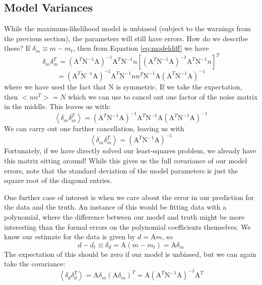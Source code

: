 \documentclass[letterpaper,11pt,preprint]{aastex}
\begin{document}
{\subsection{Model Variances}
While the maximum-likelihood model is unbiased (subject to the
warnings from the previous section), the parameters will still have
errors.  How do we describe these?  If $\delta_m \equiv m-m_t$, then
from Equation \ref{eq:modeldiff} we have
$$\delta_m \delta_m^T = \left (\mathrm{A}^T \mathrm{N}^{-1}\mathrm{A}
\right)^{-1}\mathrm{A}^T\mathrm{N}^{-1}n 
\left [  \left (\mathrm{A}^T \mathrm{N}^{-1}\mathrm{A}
  \right)^{-1}\mathrm{A}^T\mathrm{N}^{-1}n \right ]^T$$
$$=\left (\mathrm{A}^T \mathrm{N}^{-1}\mathrm{A}
\right)^{-1}\mathrm{A}^T\mathrm{N}^{-1}n n^T \mathrm{N}^{-1}
\mathrm{A} \left (\mathrm{A}^T \mathrm{N}^{-1}\mathrm{A}\right)^{-1}$$
where we have used the fact that $\mathrm{N}$ is symmetric.  If we
take the expectation, then $<nn^T>=N$ which we can use to cancel out
one factor of the noise matrix in the middle.  This leaves us with:
$$\left < \delta_m \delta_m^T \right > =\left (\mathrm{A}^T
\mathrm{N}^{-1}\mathrm{A}\right)^{-1}\mathrm{A}^T\mathrm{N}^{-1}
\mathrm{A} \left (\mathrm{A}^T \mathrm{N}^{-1}\mathrm{A}\right)^{-1} $$
We can carry out one further cancellation, leaving us with 
\begin{equation} \label{eq:modelerrs}
\left < \delta_m \delta_m^T \right > =\left
(\mathrm{A}^T\mathrm{N}^{-1}\mathrm{A}\right)^{-1}
\end{equation}
Fortunately, if we have directly solved our least-squares problem, we
already have this matrix sitting around!  While this gives us the full
covariance of our model errors, note that the standard deviation of
the model parameters is just the square root of the diagonal entries.  
 
One further case of interest is when we care about the error in our
prediction for the data and the truth.  An instance of this would be
fitting data with a polynomial, where the difference between our model
and truth might be more interesting than the formal errors on the polynomial
coefficients themselves.  We know our estimate for the data is given
by $d=\mathrm{A}m$, so 
$$d-d_t\equiv \delta_d=\mathrm{A}(m-m_t)=\mathrm{A}\delta_m$$
The expectation of this should be zero if our model is unbiased, but
we can again take the covariance:
\begin{equation}\label{eq:dataerrs}
\left <\delta_d \delta_d^T \right > = \mathrm{A}\delta_m \left
(\mathrm{A}\delta_m \right)^T = \mathrm{A}\left (
\mathrm{A}^T\mathrm{N}^{-1}\mathrm{A}\right)^{-1} \mathrm{A}^T \end{equation}


}
\end{document}
